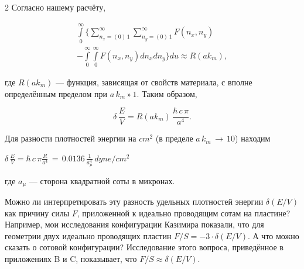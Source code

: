\documentclass[twoside, 10pt]{article}
\def\myvspacebeforesubsection{-2.0mm}
\def\myvspaceaftersubsection{-2.5mm}
\begin{document}
\begin{multicols}{2}
    Согласно нашему расчёту,

\vspace{-3.5mm}
\begin{equation}
\begin{array}{l}
    \int\limits_{0}^{\infty} \Bigg\{ \sum\limits_{n_x=\left(0\right)\,1}^{\infty} \sum\limits_{n_y=\left(0\right)\,1}^{\infty} F\left(n_x, n_y\right) \\
- \int\limits_{0}^{\infty} \int\limits_{0}^{\infty} F\left(n_x, n_y\right) d{n_x} d{n_y} \Bigg\} d{u} \approx R\left(a k_m\right),
\end{array}
\end{equation}


    где \(R\left(a k_m\right)\) — функция, зависящая от свойств материала, с вполне определённым пределом при \(a\,k_m\,»\,1\). Таким образом,

    \begin{equation}
\delta\,\frac{E}{V} = R\left(a k_m\right)\,\frac{\hbar\,c\,\pi}{a^4}.
\end{equation}

    Для разности плотностей энергии на \(cm^2\) (в пределе \(a\,k_m\,\rightarrow \,10\)) находим

    \(\delta\,\frac{E}{V} = \hbar\,c\, \pi\frac{R}{a^4}\,=\,0.0136\,\frac{1}{a_{\mu}^4}\,dyne/cm^2\)

    где \(a_{\mu}\) — сторона квадратной соты в микронах.


    Можно ли интерпретировать эту разность удельных плотностей энергии \(\delta\left(E/V\right)\) как причину силы \(F\), приложенной к идеально проводящим сотам на пластине? Например, мои исследования конфигурации Казимира показали, что для геометрии двух идеально проводящих пластин \(F/S = -3 \cdot \delta\left(E/V\right)\). А что можно сказать о сотовой конфигурации? Исследование этого вопроса, приведённое в приложениях B и C, показывает, что \(F/S \approx \delta\left(E/V\right)\).


\vspace{\myvspacebeforesubsection}
    \subsection*{} \label{conclusions}
\vspace{\myvspaceaftersubsection}



\end{multicols}
\end{document}
